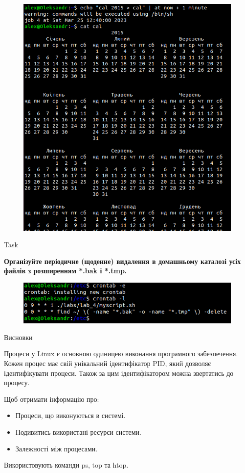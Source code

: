 \documentclass[a4paper,12pt]{article}
\newcommand{\RomanNumeralCaps}[1]{\MakeUppercase{\romannumeral #1}}
\begin{document}
    \begin{figure}[h!]
        \begin{minipage}[h]{1\linewidth}
            \centering
            \includegraphics[width=0.6\linewidth]{Prt sc/Figure_8.png}  
        \end{minipage}
    \end{figure}

\newpage
    \begin{center}
        \Large{Task \RomanNumeralCaps{9}}
    \end{center}
    \textbf{Організуйте періодичне (щоденне) видалення в домашньому каталозі усіх файлів з розширенням *.bak і *.tmp.}
    \begin{figure}[h!]
        \begin{minipage}[h]{1\linewidth}
            \centering
            \includegraphics[width=0.6\linewidth]{Prt sc/Figure_9.png}  
        \end{minipage}
    \end{figure}
    \begin{center}
        \Large{Висновки}
    \end{center}

    Процеси у Linux є основною одиницею виконання програмного забезпечення. Кожен процес має свій унікальний ідентифікатор PID, який дозволяє ідентифікувати процеси.
    Також за цим ідентифікатором можна звертатись до процесу.

    Щоб отримати інформацію про:
    \begin{itemize}
        \item Процеси, що виконуються в системі.
        \item Подивитись використані ресурси системи.
        \item Залежності між процесами.
    \end{itemize}
    Використовують команди ps, top та htop. 
\end{document}
